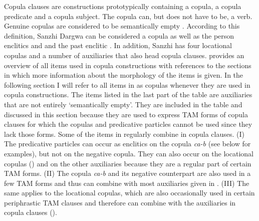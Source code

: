 Copula clauses are constructions prototypically containing a copula, a copula predicate and a copula subject. The copula can, but does not have to be, a verb. Genuine copulas are considered to be semantically empty \citep[5]{Pustet2005}. According to this definition, Sanzhi Dargwa  can be considered a copula as well as the person enclitics  and  and the past enclitic . In addition, Sanzhi has four locational copulas and a number of auxiliaries that also head copula clauses.  provides an overview of all items used in copula constructions with references to the sections in which more information about the morphology of the items is given. In the following section I will refer to all items in  as copulas whenever they are used in copula constructions. The items listed in the last part of the table are auxiliaries that are not entirely `semantically empty'. They are included in the table and discussed in this section because they are used to express TAM forms of copula clauses for which the copulas and predicative particles cannot be used since they lack those forms. Some of the items in  regularly combine in copula clauses. (I) The predicative particles can occur as enclitics on the copula \textit{ca-b} (see below for examples), but not on the negative copula. They can also occur on the locational copulas () and on the other auxiliaries because they are a regular part of certain TAM forms. (II) The copula \textit{ca-b} and its negative counterpart are also used in a few TAM forms and thus can combine with most auxiliaries given in  . (III) The same applies to the locational copulas, which are also occasionally used in certain periphrastic TAM clauses and therefore can combine with the auxiliaries in copula clauses ().

